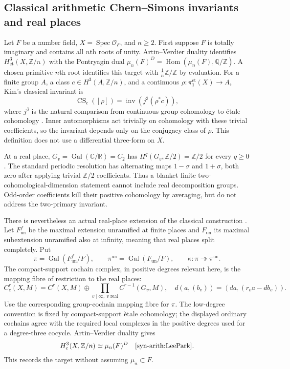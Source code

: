 \subsection{Classical arithmetic Chern--Simons invariants and real places}
\label{syn-arith:acs}
Let $F$ be a number field, $X=\operatorname{Spec}\mathcal O_F$, and $n\geq2$.
First suppose $F$ is totally imaginary and contains all $n$th roots of
unity.  Artin--Verdier duality identifies
$H^3_{\mathrm{et}}(X,\mathbb Z/n)$ with the Pontryagin dual
$\mu_n(F)^D=\operatorname{Hom}(\mu_n(F),\mathbb Q/\mathbb Z)$.
A chosen primitive $n$th root identifies this target with
$\tfrac1n\mathbb Z/\mathbb Z$ by evaluation.
For a finite group $A$, a class $c\in H^3(A,\mathbb Z/n)$, and a continuous
$\rho:\pi_1^{\mathrm{et}}(X)\to A$, Kim's classical invariant is
\[
 \operatorname{CS}_c([\rho])=\operatorname{inv}(j^3(\rho^*c)),
\]
where $j^3$ is the natural comparison from continuous group cohomology to
\'etale cohomology \cite[\S1]{syn-arith:KimCS}.
Inner automorphisms act trivially on cohomology with these trivial
coefficients, so the invariant depends only on the conjugacy class of $\rho$.
This definition does not use a differential three-form on $X$.

At a real place, $G_v=\operatorname{Gal}(\mathbb C/\mathbb R)=C_2$ has
$H^q(G_v,\mathbb Z/2)=\mathbb Z/2$ for every $q\geq0$.
The standard periodic resolution has alternating maps $1-\sigma$ and
$1+\sigma$, both zero after applying trivial $\mathbb Z/2$ coefficients.
Thus a blanket finite two-cohomological-dimension statement cannot include
real decomposition groups.  Odd-order coefficients kill their positive
cohomology by averaging, but do not address the two-primary invariant.

There is nevertheless an actual real-place extension of the classical
construction \cite[\S\S2.2--2.3]{syn-arith:LeePark}.
Let $F_{\mathrm{un}}^f$ be the maximal extension unramified at finite places
and $F_{\mathrm{un}}$ its maximal subextension unramified also at infinity,
meaning that real places split completely.  Put
\[
 \pi=\operatorname{Gal}(F_{\mathrm{un}}^f/F),\qquad
 \pi^{\mathrm{un}}=\operatorname{Gal}(F_{\mathrm{un}}/F),\qquad
 \kappa:\pi\twoheadrightarrow\pi^{\mathrm{un}}.
\]
The compact-support cochain complex, in positive degrees relevant here, is
the mapping fibre of restriction to the real places:
\[
 C_c^r(X,M)=C^r(X,M)\oplus\prod_{v\mid\infty,\ v\text{ real}}C^{r-1}(G_v,M),
 \quad d(a,(b_v))=(da,(r_va-db_v)).
\]
Use the corresponding group-cochain mapping fibre for $\pi$.
The low-degree convention is fixed by compact-support \`etale cohomology;
the displayed ordinary cochains agree with the required local complexes in
the positive degrees used for a degree-three cocycle.
Artin--Verdier duality gives
\[
 H_c^3(X,\mathbb Z/n)\simeq\mu_n(F)^D
 \quad\text{\cite[Proposition~2.4]{syn-arith:LeePark}}.
\]
This records the target without assuming $\mu_n\subset F$.

